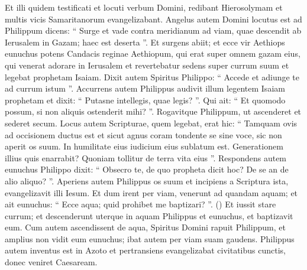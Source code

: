 \begin{biblechapter}
\begin{biblechapter}
\begin{biblechapter}
\begin{biblechapter}
\begin{biblechapter}
\begin{biblechapter}
\begin{biblechapter}
\begin{biblechapter}
\verse Et illi quidem testificati et locuti verbum Domini, redibant Hierosolymam et multis vicis Samaritanorum evangelizabant.
 \verse Angelus autem Domini locutus est ad Philippum dicens: “ Surge et vade contra meridianum ad viam, quae descendit ab Ierusalem in Gazam; haec est deserta ”. 
 \verse Et surgens abiit; et ecce vir Aethiops eunuchus potens Candacis reginae Aethiopum, qui erat super omnem gazam eius, qui venerat adorare in Ierusalem 
 \verse et revertebatur sedens super currum suum et legebat prophetam Isaiam. 
\verse Dixit autem Spiritus Philippo: “ Accede et adiunge te ad currum istum ”. 
\verse Accurrens autem Philippus audivit illum legentem Isaiam prophetam et dixit: “ Putasne intellegis, quae legis? ”. 
\verse Qui ait: “ Et quomodo possum, si non aliquis ostenderit mihi? ”. Rogavitque Philippum, ut ascenderet et sederet secum. 
\verse Locus autem Scripturae, quem legebat, erat hic:
 “ Tamquam ovis ad occisionem ductus est
 et sicut agnus coram tondente se sine voce,
 sic non aperit os suum.
 \verse In humilitate eius iudicium eius sublatum est.
 Generationem illius quis enarrabit?
 Quoniam tollitur de terra vita eius ”.
 \verse Respondens autem eunuchus Philippo dixit: “ Obsecro te, de quo propheta dicit hoc? De se an de alio aliquo? ”. 
\verse Aperiens autem Philippus os suum et incipiens a Scriptura ista, evangelizavit illi Iesum. 
\verse Et dum irent per viam, venerunt ad quandam aquam; et ait eunuchus: “ Ecce aqua; quid prohibet me baptizari? ”.
(\verse) \verse Et iussit stare currum; et descenderunt uterque in aquam Philippus et eunuchus, et baptizavit eum. 
\verse Cum autem ascendissent de aqua, Spiritus Domini rapuit Philippum, et amplius non vidit eum eunuchus; ibat autem per viam suam gaudens. 
\verse Philippus autem inventus est in Azoto et pertransiens evangelizabat civitatibus cunctis, donec veniret Caesaream.
 

\end{biblechapter}
\end{biblechapter}
\end{biblechapter}
\end{biblechapter}
\end{biblechapter}
\end{biblechapter}
\end{biblechapter}
\end{biblechapter}
